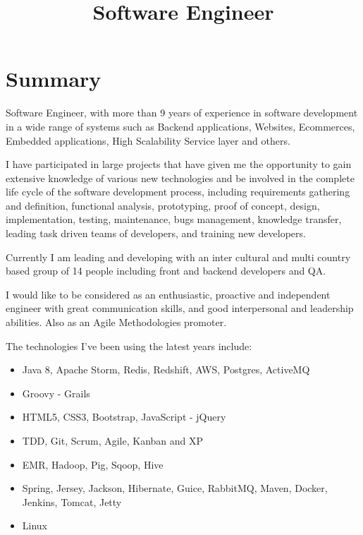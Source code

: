 \documentclass[11pt,a4paper,sans]{moderncv}        %
\title{Software Engineer}                               %
\begin{document}
\makecvtitle

\section{Summary}
Software Engineer, with more than 9 years of experience in software development in a wide range of systems 
such as Backend applications, Websites, Ecommerces, Embedded applications, High Scalability Service layer and
others.

\medskip I have participated in large projects that have given me the opportunity to gain extensive knowledge of various new
technologies and be involved in the complete life cycle of the software development process, including requirements
gathering and definition, functional analysis, prototyping, proof of concept, design, implementation, testing,
maintenance, bugs management, knowledge transfer, leading task driven teams of developers, and training new
developers.

\medskip Currently I am leading and developing with an inter cultural and multi country based group of 14 people including front and backend developers and QA.

\medskip I would like to be considered as an enthusiastic, proactive and independent engineer with great communication skills,
and good interpersonal and leadership abilities. Also as an Agile Methodologies promoter.

\medskip The technologies I've been using the latest years include:
\begin{itemize}
  \item Java 8, Apache Storm, Redis, Redshift, AWS, Postgres, ActiveMQ
  \item Groovy - Grails
  \item HTML5, CSS3, Bootstrap, JavaScript - jQuery
  \item TDD, Git, Scrum, Agile, Kanban and XP
  \item EMR, Hadoop, Pig, Sqoop, Hive
  \item Spring, Jersey, Jackson, Hibernate, Guice, RabbitMQ, Maven, Docker, Jenkins, Tomcat, Jetty
  \item Linux
\end{itemize}
\clearpage
\end{document}
